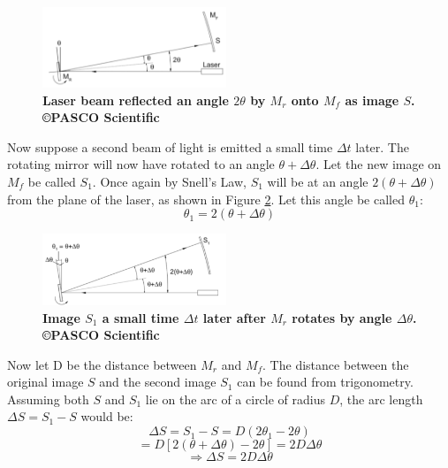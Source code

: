 \documentclass[twocolumn]{article}
\begin{document}
	\begin{figure}[!ht]
		\centering
		\includegraphics[width=0.49\textwidth]{Images/MrMfAngles.png}
		\caption{\textbf{Laser beam reflected an angle $2\theta$ by $M_r$ onto $M_f$ as image $S$.\cite{lee_instruction_????} \copyright PASCO Scientific}}
		\label{fig:MrMfAngles}
	\end{figure}
	Now suppose a second beam of light is emitted a small time $\Delta t$ later. 
	The rotating mirror will now have rotated to an angle $\theta + \Delta \theta$.
	Let the new image on $M_f$ be called $S_1$. 
	Once again by Snell's Law, $S_1$ will be at an angle $2(\theta + \Delta \theta)$ from the plane of the laser, as shown in Figure \ref{fig:MrMfAngles2}. 
	Let this angle be called $\theta_1$:
	\begin{equation}
		\theta_1 = 2(\theta + \Delta \theta)
	\end{equation}
	\begin{figure}[!ht]
		\centering
		\includegraphics[width=0.49\textwidth]{Images/MrMfAngles2.png}
		\caption{\textbf{Image $S_1$ a small time $\Delta t$ later after $M_r$ rotates by angle $\Delta\theta$.\cite{lee_instruction_????} \copyright PASCO Scientific}}
		\label{fig:MrMfAngles2}
	\end{figure}
	
	Now let D be the distance between $M_r$ and $M_f$. 
	The distance between the original image $S$ and the second image $S_1$ can be found from trigonometry. 
	Assuming both $S$ and $S_1$ lie on the arc of a circle of radius $D$, the arc length $\Delta S = S_1-S$ would be:
	\begin{equation*}
		\Delta S = S_1 - S = D(2\theta_1 - 2\theta)
	\end{equation*}
	\begin{equation*}
		= D[2(\theta + \Delta \theta) - 2\theta] = 2D\Delta\theta
	\end{equation*}
	\begin{equation}
		\Rightarrow \Delta S = 2D\Delta\theta
		\label{eq:DeltaS}
	\end{equation}
	
\end{document}
